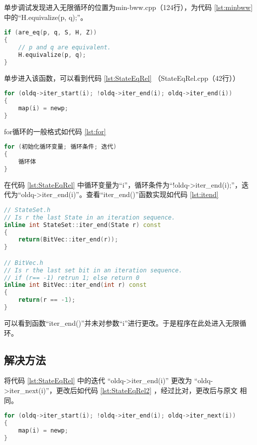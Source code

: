 单步调试发现进入无限循环的位置为min-bww.cpp（124行），为代码 \ref{lst:minbww} 中的“H.equivalize(p, q);”。
\lstset{style=mystyle}
\begin{lstlisting}[language=C++,label={lst:minbww},caption={min-bww.cpp}]
if (are_eq(p, q, S, H, Z))
{
    // p and q are equivalent.
    H.equivalize(p, q);
}
\end{lstlisting}
单步进入该函数，可以看到代码 \ref{lst:StateEqRel} （StateEqRel.cpp（42行））
\lstset{style=mystyle}
\begin{lstlisting}[language=C++,label={lst:StateEqRel},caption={StateEqRel.cpp}]
for (oldq->iter_start(i); !oldq->iter_end(i); oldq->iter_end(i))
{
    map(i) = newp;
}
\end{lstlisting}
for循环的一般格式如代码 \ref{lst:for}
\lstset{style=mystyle}
\begin{lstlisting}[language=C++,label={lst:for},caption={for 循环的一般格式}]
for (初始化循环变量; 循环条件; 迭代)
{
    循环体
}
\end{lstlisting}
在代码 \ref{lst:StateEqRel} 中循环变量为“i”，循环条件为“!oldq->iter\_end(i);”，迭代为“oldq->iter\_end(i)”。查看“iter\_end()”函数实现如代码 \ref{lst:itend}
\lstset{style=mystyle}
\begin{lstlisting}[language=C++,label={lst:itend},caption={函数 iter\_end() 的实现}]
// StateSet.h
// Is r the last State in an iteration sequence.
inline int StateSet::iter_end(State r) const
{
	return(BitVec::iter_end(r));
}

// BitVec.h
// Is r the last set bit in an iteration sequence.
// if (r== -1) retrun 1; else return 0
inline int BitVec::iter_end(int r) const
{
	return(r == -1);
}
\end{lstlisting}
可以看到函数“iter\_end()”并未对参数“i”进行更改。于是程序在此处进入无限循环。

\subsection{解决方法}

将代码 \ref{lst:StateEqRel} 中的迭代 “oldq->iter\_end(i)” 更改为 “oldq->iter\_next(i)”，更改后如代码 \ref{lst:StateEqRel2} ，经过比对，更改后与原文 \cite{watson1994design} 相同。
\lstset{style=mystyle}
\begin{lstlisting}[language=C++,label={lst:StateEqRel2},caption={StateEqRel.cpp}]
for (oldq->iter_start(i); !oldq->iter_end(i); oldq->iter_next(i))
{
    map(i) = newp;
}
\end{lstlisting}

